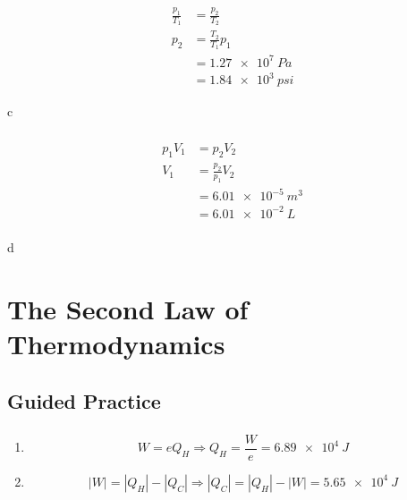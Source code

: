 \documentclass{article}
\begin{document}
\subsubsection{}

\begin{align*}
  \frac{p_1}{T_1} & = \frac{p_2}{T_2}     \\
  p_2             & = \frac{T_2}{T_1} p_1 \\
                  & = \qty{1.27e7}{Pa}    \\
                  & = \qty{1.84e3}{psi}
\end{align*}

c

\setcounter{subsubsection}{64}
\subsubsection{}

\begin{align*}
  p_1 V_1 & = p_2 V_2             \\
  V_1     & = \frac{p_2}{p_1} V_2 \\
          & = \qty{6.01e-5}{m^3}  \\
          & = \qty{6.01e-2}{L}    \\
\end{align*}

d

\section{The Second Law of Thermodynamics}

\subsection{Guided Practice}

\subsubsection{}

\begin{enumerate}
  \item \[W = e Q_H \Rightarrow Q_H = \frac{W}{e} = \qty{6.89e4}{J}\]

  \item \[|W| = |Q_H| - |Q_C| \Rightarrow |Q_C| = |Q_H| - |W| = \qty{5.65e4}{J}\]
\end{enumerate}

\subsubsection{}
\end{document}
